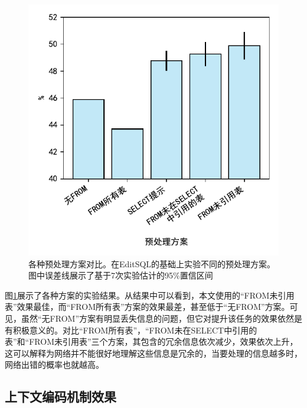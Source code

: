 \begin{figure}[]
    \centering
    \includegraphics{figure/preprocess.pdf}
    \caption{各种预处理方案对比。在EditSQL的基础上实验不同的预处理方案。图中误差线展示了基于7次实验估计的95\%置信区间}
    \label{preprocess-results}
\end{figure}

图\ref{preprocess-results}展示了各种方案的实验结果。从结果中可以看到，本文使用的“FROM未引用表”效果最佳，而“FROM所有表”方案的效果最差，甚至低于“无FROM”方案。可见，虽然“无FROM”方案有明显丢失信息的问题，但它对提升该任务的效果依然是有积极意义的。对比“FROM所有表”，“FROM未在SELECT中引用的表”和“FROM未引用表”三个方案，其包含的冗余信息依次减少，效果依次上升，这可以解释为网络并不能很好地理解这些信息是冗余的，当要处理的信息越多时，网络出错的概率也就越高。

\subsection{上下文编码机制效果}

